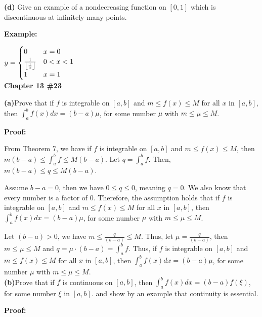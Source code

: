 \documentclass[a4paper,12pt]{report}
\DeclarePairedDelimiter\floor{\lfloor}{\rfloor}
\begin{document}
\noindent
\textbf{(d)} Give an example of a nondecreasing function on $[0,1]$ which is discontinuous at infinitely many points. 

\noindent
\textbf{Example: }

 $y =
    \begin{cases}
      0 & x=0\\
      \frac{1}{\floor*{\frac{1}{x}}} & 0<x<1\\
      1 & x=1
    \end{cases}  $\\
    
\noindent
\textbf{Chapter 13 \#23}

\noindent
\textbf{(a)}Prove that if $f$ is integrable on $[a,b]$ and $m\leq f(x)\leq M$ for all $x$ in $[a,b]$, then $\int_a^bf(x)dx=(b-a)\mu$, for some number $\mu$ with $m\leq \mu\leq M$.

\noindent
\textbf{Proof:}

\noindent
From Theorem 7, we have if $f$ is integrable on $[a,b]$ and $m\leq f(x)\leq M$, then $m(b-a)\leq \int_{a}^{b}f\leq M(b-a)$. Let $q = \int_{a}^{b}f$. Then, $m(b-a)\leq q\leq M(b-a)$. 

\noindent
Assume $b-a=0$, then we have $0\leq q \leq 0$, meaning $q=0$. We also know that every number is a factor of $0$. Therefore, the assumption holds that if $f$ is integrable on $[a,b]$ and $m\leq f(x)\leq M$ for all $x$ in $[a,b]$, then $\int_a^bf(x)dx=(b-a)\mu$, for some number $\mu$ with $m\leq \mu\leq M$.

\noindent
Let $(b-a)>0$, we have $m\leq \frac{q}{(b-a)}\leq M$. Thus, let $\mu = \frac{q}{(b-a)}$, then $m\leq \mu\leq M$ and $q=\mu\cdot{(b-a)}=\int_{a}^{b}f$. Thus, if $f$ is integrable on $[a,b]$ and $m\leq f(x)\leq M$ for all $x$ in $[a,b]$, then $\int_a^bf(x)dx=(b-a)\mu$, for some number $\mu$ with $m\leq \mu\leq M$.\\

\noindent
\textbf{(b)}Prove that if $f$ is continuous on $[a,b]$, then $\int_a^bf(x)dx=(b-a)f(\xi)$, for some number $\xi$ in $[a,b]$. and show by an example that continuity is essential.

\noindent
\textbf{Proof: }
\end{document}
